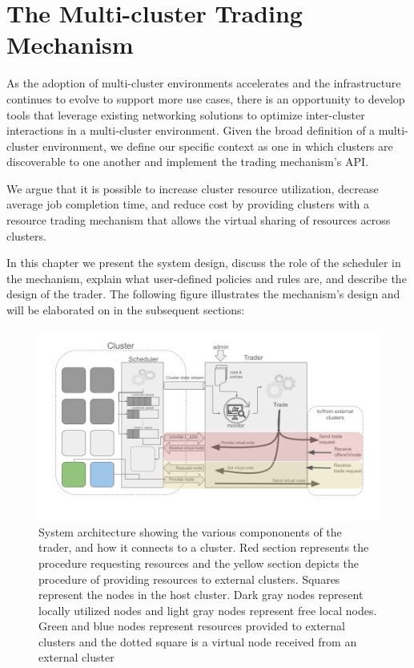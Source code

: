 
\chapter{The Multi-cluster Trading Mechanism}

As the adoption of multi-cluster environments accelerates and the
infrastructure continues to evolve to support more use cases, there is an
opportunity to develop tools that leverage existing networking solutions to
optimize inter-cluster interactions in a multi-cluster environment. Given the
broad definition of a multi-cluster environment, we define our specific context
as one in which clusters are discoverable to one another and implement the
trading mechanism's API.

We argue that it is possible to increase cluster resource utilization, decrease
average job completion time, and reduce cost by providing clusters with a
resource trading mechanism that allows the virtual sharing of resources across
clusters. 

In this chapter we present the system design, discuss the role of the scheduler
in the mechanism, explain what user-defined policies and rules are, and
describe the design of the trader. The following figure illustrates the
mechanism's design and will be elaborated on in the subsequent sections: 

\begin{figure}[H]
  \centerline{\includegraphics[scale=0.45]{figures/system-diagram}}
  \caption{System architecture showing the various compononents of the trader,
    and how it connects to a cluster. Red section represents the procedure
    requesting resources and the yellow section depicts the procedure of
    providing resources to external clusters. Squares represent the nodes in
    the host cluster. Dark gray nodes represent locally utilized nodes and light
    gray nodes represent free local nodes. Green and blue nodes represent
    resources    provided to external clusters and the dotted square is a
    virtual node received from an external cluster} 
\end{figure}

